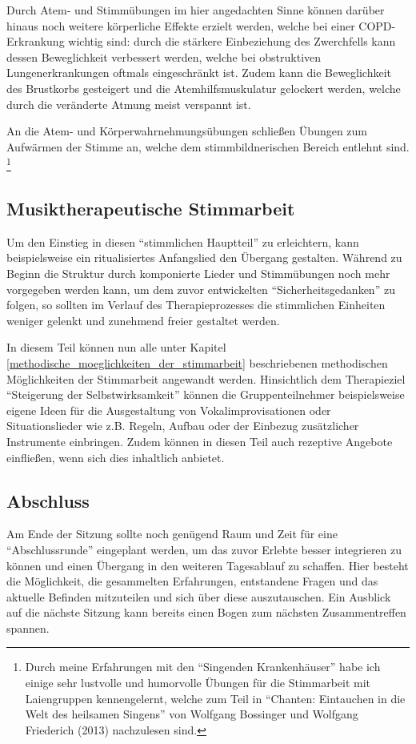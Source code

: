 Durch Atem- und Stimmübungen im hier angedachten Sinne können darüber hinaus noch weitere körperliche Effekte erzielt werden, welche bei einer COPD-Erkrankung wichtig sind: durch die stärkere Einbeziehung des Zwerchfells kann dessen Beweglichkeit verbessert werden, welche bei obstruktiven Lungenerkrankungen oftmals eingeschränkt ist. Zudem kann die Beweglichkeit des Brustkorbs gesteigert und die Atemhilfsmuskulatur gelockert werden, welche durch die veränderte Atmung meist verspannt ist. 

An die Atem- und Körperwahrnehmungsübungen schließen Übungen zum Aufwärmen der Stimme an, welche dem stimmbildnerischen Bereich entlehnt sind. \footnote{Durch meine Erfahrungen mit den "`Singenden Krankenhäuser"' habe ich einige sehr lustvolle und humorvolle Übungen für die Stimmarbeit mit Laiengruppen kennengelernt, welche zum Teil in "`Chanten: Eintauchen in die Welt des heilsamen Singens"' von Wolfgang Bossinger und Wolfgang Friederich (2013) nachzulesen sind.}

\subsection*{Musiktherapeutische Stimmarbeit}
Um den Einstieg in diesen "`stimmlichen Hauptteil"' zu erleichtern, kann beispielsweise ein ritualisiertes Anfangslied den Übergang gestalten. 
Während zu Beginn die Struktur durch komponierte Lieder und Stimmübungen noch mehr vorgegeben werden kann, um dem zuvor entwickelten "`Sicherheitsgedanken"' zu folgen, so sollten im Verlauf des Therapieprozesses die stimmlichen Einheiten weniger gelenkt und zunehmend freier gestaltet werden. 

In diesem Teil können nun alle unter Kapitel \ref{methodische_moeglichkeiten_der_stimmarbeit} beschriebenen methodischen Möglichkeiten der Stimmarbeit angewandt werden. 
Hinsichtlich dem Therapieziel "`Steigerung der Selbstwirksamkeit"' können die Gruppenteilnehmer beispielsweise eigene Ideen für die Ausgestaltung von Vokalimprovisationen oder Situationslieder wie z.B. Regeln, Aufbau oder der Einbezug zusätzlicher Instrumente einbringen. Zudem können in diesen Teil auch rezeptive Angebote einfließen, wenn sich dies inhaltlich anbietet.

\subsection*{Abschluss}
Am Ende der Sitzung sollte noch genügend Raum und Zeit für eine "`Abschlussrunde"' eingeplant werden, um das zuvor Erlebte besser integrieren zu können und einen Übergang in den weiteren Tagesablauf zu schaffen. Hier besteht die Möglichkeit, die gesammelten Erfahrungen, entstandene Fragen und das aktuelle Befinden mitzuteilen und sich über diese auszutauschen. Ein Ausblick auf die nächste Sitzung kann bereits einen Bogen zum nächsten Zusammentreffen spannen.

